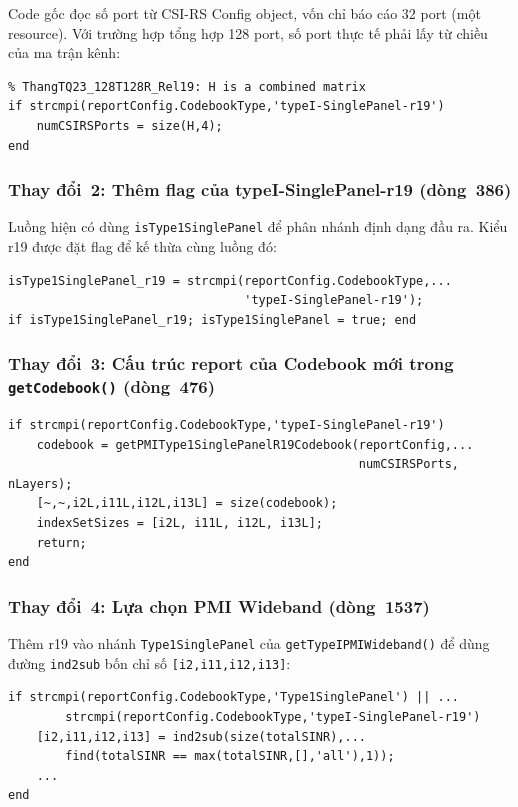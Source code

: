 \documentclass[11pt,a4paper]{article}
\begin{document}
Code gốc đọc số port từ CSI-RS Config object, vốn chỉ báo cáo 32 port
(một resource). Với trường hợp tổng hợp 128 port, số port thực tế
phải lấy từ chiều của ma trận kênh:

\begin{lstlisting}
% ThangTQ23_128T128R_Rel19: H is a combined matrix
if strcmpi(reportConfig.CodebookType,'typeI-SinglePanel-r19')
    numCSIRSPorts = size(H,4);
end
\end{lstlisting}

\subsubsection{Thay đổi~2: Thêm flag của  typeI-SinglePanel-r19  (dòng~386)}

Luồng hiện có dùng \texttt{isType1SinglePanel} để phân nhánh định dạng đầu ra.
Kiểu r19 được đặt flag để kế thừa cùng luồng đó:

\begin{lstlisting}
isType1SinglePanel_r19 = strcmpi(reportConfig.CodebookType,...
                                 'typeI-SinglePanel-r19');
if isType1SinglePanel_r19; isType1SinglePanel = true; end
\end{lstlisting}

\subsubsection{Thay đổi~3: Cấu trúc report của Codebook mới trong \texttt{getCodebook()} (dòng~476)}

\begin{lstlisting}
if strcmpi(reportConfig.CodebookType,'typeI-SinglePanel-r19')
    codebook = getPMIType1SinglePanelR19Codebook(reportConfig,...
                                                 numCSIRSPorts, nLayers);
    [~,~,i2L,i11L,i12L,i13L] = size(codebook);
    indexSetSizes = [i2L, i11L, i12L, i13L];
    return;
end
\end{lstlisting}

\subsubsection{Thay đổi~4: Lựa chọn PMI Wideband (dòng~1537)}

Thêm r19 vào nhánh \texttt{Type1SinglePanel} của
\texttt{getTypeIPMIWideband()} để dùng đường \texttt{ind2sub} bốn chỉ số
\texttt{[i2,i11,i12,i13]}:

\begin{lstlisting}
if strcmpi(reportConfig.CodebookType,'Type1SinglePanel') || ...
        strcmpi(reportConfig.CodebookType,'typeI-SinglePanel-r19')
    [i2,i11,i12,i13] = ind2sub(size(totalSINR),...
        find(totalSINR == max(totalSINR,[],'all'),1));
    ...
end
\end{lstlisting}
\end{document}
